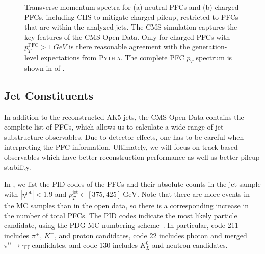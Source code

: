 \documentclass[aps,prd,twocolumn,preprintnumbers,nofootinbib,longbibliography,floatfix,superscriptaddress]{revtex4-1}
\begin{document}
\begin{figure*}[t]
  \caption{Transverse momentum spectra for (a) neutral PFCs and (b) charged PFCs, including CHS to mitigate charged pileup, restricted to PFCs that are within the analyzed jets.
  The CMS simulation captures the key features of the CMS Open Data.
  Only for charged PFCs with $p_T^\text{PFC} > \SI{1}{GeV}$ is there reasonable agreement with the generation-level expectations from \textsc{Pythia}.
  The complete PFC $p_T$ spectrum is shown in  of .  
  }
  \label{fig:PFC_spectrum_zoom}
\end{figure*}


\subsection{Jet Constituents}
\label{subsec:jetconstituents}


In addition to the reconstructed AK5 jets, the CMS Open Data contains the complete list of PFCs, which allows us to calculate a wide range of jet substructure observables.
%
Due to detector effects, one has to be careful when interpreting the PFC information.
%
Ultimately, we will focus on track-based observables which have better reconstruction performance as well as better pileup stability.


In , we list the PID codes of the PFCs and their absolute counts in the jet sample with $|\eta^\text{jet}| < 1.9$ and $p_T^\text{jet} \in [375,425]~\text{GeV}$.
%
Note that there are more events in the MC samples than in the open data, so there is a corresponding increase in the number of total PFCs.
%
The PID codes indicate the most likely particle candidate, using the PDG MC numbering scheme~\cite{Tanabashi:2018oca}.
%
In particular, code 211 includes $\pi^+$, $K^+$, and proton candidates, code 22 includes photon and merged $\pi^0 \to \gamma \gamma$ candidates, and code 130 includes $K^0_L$ and neutron candidates.
\end{document}
